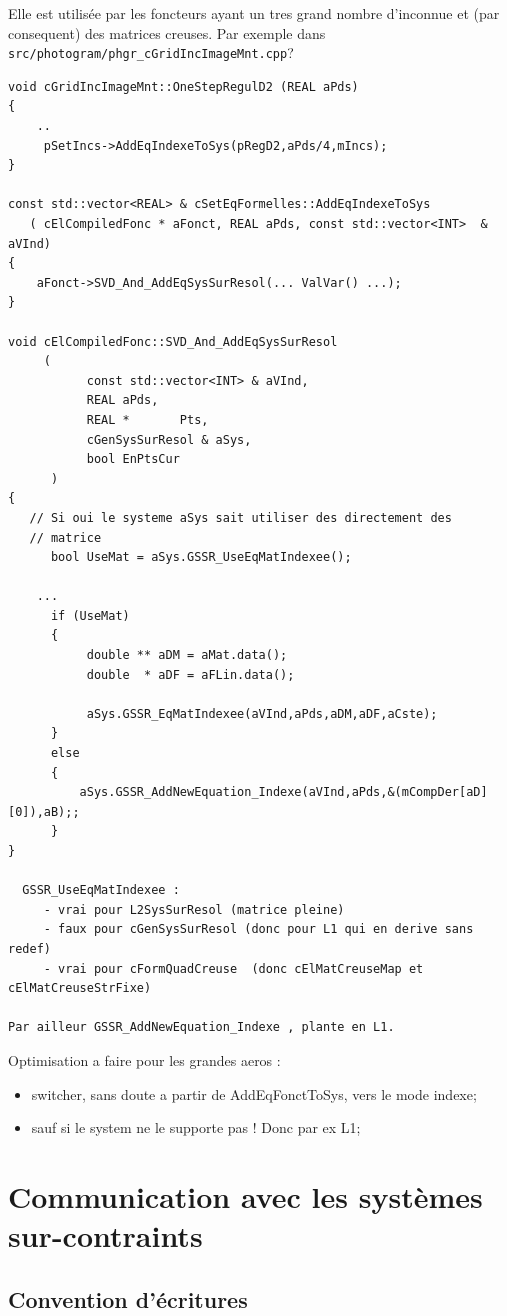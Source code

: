 Elle est utilisée par les foncteurs ayant un tres grand nombre d'inconnue
et (par consequent) des matrices creuses. Par exemple dans
{\tt src/photogram/phgr\_cGridIncImageMnt.cpp}?


{\small
\begin{verbatim}
void cGridIncImageMnt::OneStepRegulD2 (REAL aPds)
{
    ..
     pSetIncs->AddEqIndexeToSys(pRegD2,aPds/4,mIncs);
}

const std::vector<REAL> & cSetEqFormelles::AddEqIndexeToSys
   ( cElCompiledFonc * aFonct, REAL aPds, const std::vector<INT>  & aVInd)
{
    aFonct->SVD_And_AddEqSysSurResol(... ValVar() ...);
}

void cElCompiledFonc::SVD_And_AddEqSysSurResol
     (
           const std::vector<INT> & aVInd,
           REAL aPds,
           REAL *       Pts,
           cGenSysSurResol & aSys,
           bool EnPtsCur
      )
{
   // Si oui le systeme aSys sait utiliser des directement des
   // matrice
      bool UseMat = aSys.GSSR_UseEqMatIndexee();

    ...
      if (UseMat)
      {
           double ** aDM = aMat.data();
           double  * aDF = aFLin.data();

           aSys.GSSR_EqMatIndexee(aVInd,aPds,aDM,aDF,aCste);
      }
      else
      {
          aSys.GSSR_AddNewEquation_Indexe(aVInd,aPds,&(mCompDer[aD][0]),aB);;
      }
}

  GSSR_UseEqMatIndexee :
     - vrai pour L2SysSurResol (matrice pleine)
     - faux pour cGenSysSurResol (donc pour L1 qui en derive sans redef)
     - vrai pour cFormQuadCreuse  (donc cElMatCreuseMap et cElMatCreuseStrFixe)

Par ailleur GSSR_AddNewEquation_Indexe , plante en L1.
\end{verbatim}
}

Optimisation a faire pour les grandes aeros :

\begin{itemize}
   \item   switcher, sans doute a partir de AddEqFonctToSys, vers le
   mode indexe;
    \item sauf si le system ne le supporte pas ! Donc par ex L1;
\end{itemize}


\section{Communication avec les syst\`emes sur-contraints}

\subsection{Convention d'\'ecritures}

